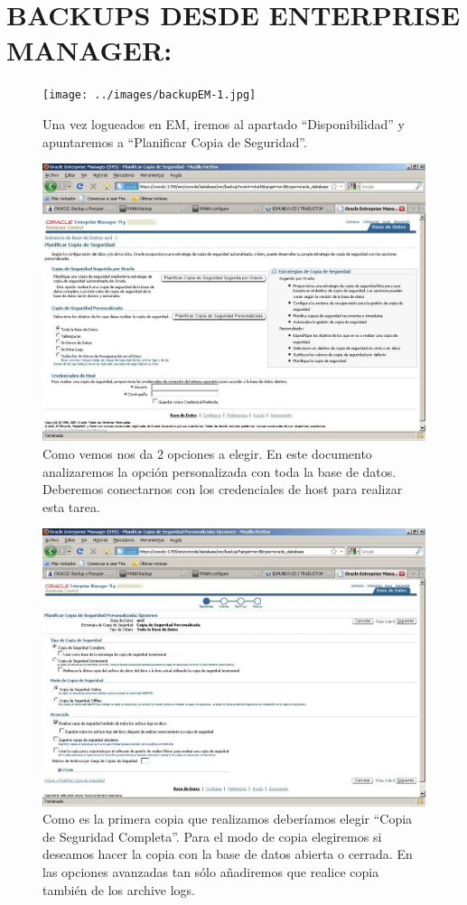 \chapter{BACKUPS  DESDE  ENTERPRISE  MANAGER:}\label{cap:1}
\begin{figure}[h]
\texttt{[image: ../images/backupEM-1.jpg]}
\caption{Una  vez  logueados  en  EM,  iremos  al  apartado  “Disponibilidad”  y  apuntaremos  a
“Planificar Copia de Seguridad”.}
\label{fig:bear}
\end{figure}

\begin{figure}[h]
\includegraphics[width=1\textwidth]{../images/backupEM-2.jpg}
\caption{Como vemos nos da 2 opciones a elegir. En este documento analizaremos la opción personalizada con toda la base de datos.
Deberemos conectarnos con los credenciales de host para realizar esta tarea.}
\label{fig:bear}
\end{figure}

\begin{figure}[h]
\includegraphics[width=1\textwidth]{../images/backupEM-3.jpg}
\caption{Como  es  la  primera  copia  que  realizamos  deberíamos  elegir  “Copia  de  Seguridad
Completa”.
Para el modo de copia elegiremos si deseamos hacer la copia con la base de datos abierta o cerrada.
En las opciones avanzadas tan sólo añadiremos que realice copia también de los archive logs.}
\label{fig:bear}
\end{figure}

